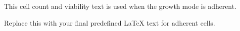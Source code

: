 This cell count and viability text is used when the growth mode is adherent.

Replace this with your final predefined LaTeX text for adherent cells.
